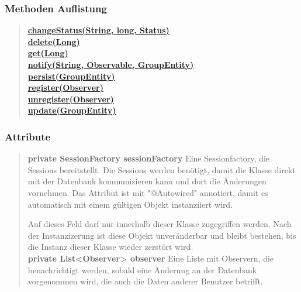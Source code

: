 \documentclass[11pt,a4paper]{article}
\begin{document}
{{{{{{{{{{{{\subsubsection{Methoden Auflistung}{
\begin{verse}
\hyperlink{edu.kit.pse17.go_app.PersistenceLayer.daos.GroupDaoImp.changeStatus(java.lang.String, long, edu.kit.pse17.go_app.PersistenceLayer.Status)}{{\bf changeStatus(String, long, Status)}} \\
\hyperlink{edu.kit.pse17.go_app.PersistenceLayer.daos.GroupDaoImp.delete(java.lang.Long)}{{\bf delete(Long)}} \\
\hyperlink{edu.kit.pse17.go_app.PersistenceLayer.daos.GroupDaoImp.get(java.lang.Long)}{{\bf get(Long)}} \\
\hyperlink{edu.kit.pse17.go_app.PersistenceLayer.daos.GroupDaoImp.notify(java.lang.String, edu.kit.pse17.go_app.ServiceLayer.Observable, edu.kit.pse17.go_app.PersistenceLayer.GroupEntity)}{{\bf notify(String, Observable, GroupEntity)}} \\
\hyperlink{edu.kit.pse17.go_app.PersistenceLayer.daos.GroupDaoImp.persist(edu.kit.pse17.go_app.PersistenceLayer.GroupEntity)}{{\bf persist(GroupEntity)}} \\
\hyperlink{edu.kit.pse17.go_app.PersistenceLayer.daos.GroupDaoImp.register(edu.kit.pse17.go_app.ServiceLayer.Observer)}{{\bf register(Observer)}} \\
\hyperlink{edu.kit.pse17.go_app.PersistenceLayer.daos.GroupDaoImp.unregister(edu.kit.pse17.go_app.ServiceLayer.Observer)}{{\bf unregister(Observer)}} \\
\hyperlink{edu.kit.pse17.go_app.PersistenceLayer.daos.GroupDaoImp.update(edu.kit.pse17.go_app.PersistenceLayer.GroupEntity)}{{\bf update(GroupEntity)}} \\
\end{verse}
}

\subsubsection{Attribute}{
\begin{verse}
{{\bf private SessionFactory sessionFactory}} Eine Sessionfactory, die Sessions bereitstellt. Die Sessions werden benötigt, damit die Klasse direkt mit der Datenbank
      kommunizieren kann und dort die Änderungen vornehmen. Das Attribut ist mit "@Autowired" annotiert, damit es automatisch
     mit einem gültigen Objekt instanziiert wird.
     
      Auf dieses Feld darf nur innerhalb dieser Klasse zugegriffen werden. Nach der Instanzizerung ist diese Objekt unveränderbar und
      bleibt bestehen, bis die Instanz dieser Klasse wieder zerstört wird.\\[0.5em]
{{\bf private List<Observer> observer}} Eine Liste mit Observern, die benachrichtigt werden, sobald eine Änderung an der Datenbank vorgenommen wird, die auch die Daten anderer Benutzer betrifft.
\end{verse}
}
}}}}}}}}}}}}
\end{document}
